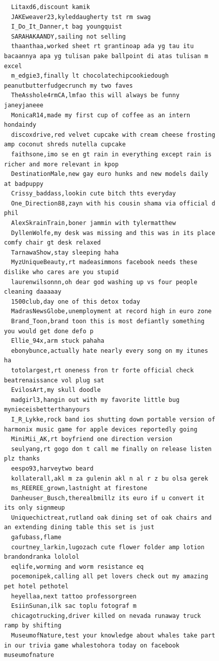 \begin{figure}[htpb]
\begin{verbatim}
  Litaxd6,discount kamik
  JAKEweaver23,kyleddaugherty tst rm swag
  I_Do_It_Danner,t bag youngquist
  SARAHAKAANDY,sailing not selling
  thaanthaa,worked sheet rt grantinoap ada yg tau itu bacaannya apa yg tulisan pake ballpoint di atas tulisan m excel
  m_edgie3,finally lt chocolatechipcookiedough peanutbutterfudgecrunch my two faves
  TheAsshole4rmCA,lmfao this will always be funny janeyjaneee
  MonicaR14,made my first cup of coffee as an intern hondaindy
  discoxdrive,red velvet cupcake with cream cheese frosting amp coconut shreds nutella cupcake
  faithsone,imo se en gt rain in everything except rain is richer and more relevant in kpop
  DestinationMale,new gay euro hunks and new models daily at badpuppy
  Crissy_baddass,lookin cute bitch thts everyday
  One_Direction88,zayn with his cousin shama via official d phil
  AlexSkrainTrain,boner jammin with tylermatthew
  DyllenWolfe,my desk was missing and this was in its place comfy chair gt desk relaxed
  TarnawaShow,stay sleeping haha
  MyzUniqueBeauty,rt madeasimmons facebook needs these dislike who cares are you stupid
  laurenwilsonnn,oh dear god washing up vs four people cleaning daaaaay
  1500club,day one of this detox today
  MadrasNewsGlobe,unemployment at record high in euro zone
  Brand_Toon,brand toon this is most defiantly something you would get done defo p
  Ellie_94x,arm stuck pahaha
  ebonybunce,actually hate nearly every song on my itunes ha
  totolargest,rt oneness fron tr forte official check beatrenaissance vol plug sat
  EvilosArt,my skull doodle
  madgirl3,hangin out with my favorite little bug mynieceisbetterthanyours
  I_R_Lykke,rock band ios shutting down portable version of harmonix music game for apple devices reportedly going
  MiniMii_AK,rt boyfriend one direction version
  seulyang,rt gogo don t call me finally on release listen plz thanks
  eespo93,harveytwo beard
  kollaterall,akl m za gulenin akl n al r z bu olsa gerek
  ms_REEREE_grown,lastnight at firestone
  Danheuser_Busch,therealbmillz its euro if u convert it its only signmeup
  Uniquechictreat,rutland oak dining set of oak chairs and an extending dining table this set is just
  gafubass,flame
  courtney_larkin,lugozach cute flower folder amp lotion brandondranka lololol
  eqlife,worming and worm resistance eq
  pocemonipek,calling all pet lovers check out my amazing pet hotel pethotel
  heyellaa,next tattoo professorgreen
  EsiinSunan,ilk sac toplu fotograf m
  chicagotrucking,driver killed on nevada runaway truck ramp by shifting
  MuseumofNature,test your knowledge about whales take part in our trivia game whalestohora today on facebook museumofnature

\end{verbatim}
\end{figure}
